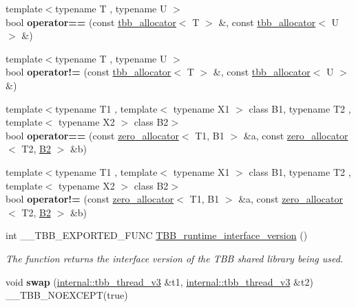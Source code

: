 \begin{DoxyCompactItemize}
\item 
\hypertarget{namespacetbb_af1595d1bfc4f7be923c17b4ee5c556ae}{}{\footnotesize template$<$typename T , typename U $>$ }\\bool {\bfseries operator==} (const \hyperlink{classtbb_1_1tbb__allocator}{tbb\+\_\+allocator}$<$ T $>$ \&, const \hyperlink{classtbb_1_1tbb__allocator}{tbb\+\_\+allocator}$<$ U $>$ \&)\label{namespacetbb_af1595d1bfc4f7be923c17b4ee5c556ae}

\item 
\hypertarget{namespacetbb_a82ff968904aaa1bb0e2152f590c47be6}{}{\footnotesize template$<$typename T , typename U $>$ }\\bool {\bfseries operator!=} (const \hyperlink{classtbb_1_1tbb__allocator}{tbb\+\_\+allocator}$<$ T $>$ \&, const \hyperlink{classtbb_1_1tbb__allocator}{tbb\+\_\+allocator}$<$ U $>$ \&)\label{namespacetbb_a82ff968904aaa1bb0e2152f590c47be6}

\item 
\hypertarget{namespacetbb_a7bf465e2f6730e2cea0c9531bec9fb2f}{}{\footnotesize template$<$typename T1 , template$<$ typename X1 $>$ class B1, typename T2 , template$<$ typename X2 $>$ class B2$>$ }\\bool {\bfseries operator==} (const \hyperlink{classtbb_1_1zero__allocator}{zero\+\_\+allocator}$<$ T1, B1 $>$ \&a, const \hyperlink{classtbb_1_1zero__allocator}{zero\+\_\+allocator}$<$ T2, \hyperlink{classB2}{B2} $>$ \&b)\label{namespacetbb_a7bf465e2f6730e2cea0c9531bec9fb2f}

\item 
\hypertarget{namespacetbb_a606762cf7c614cb5a1631955938737cd}{}{\footnotesize template$<$typename T1 , template$<$ typename X1 $>$ class B1, typename T2 , template$<$ typename X2 $>$ class B2$>$ }\\bool {\bfseries operator!=} (const \hyperlink{classtbb_1_1zero__allocator}{zero\+\_\+allocator}$<$ T1, B1 $>$ \&a, const \hyperlink{classtbb_1_1zero__allocator}{zero\+\_\+allocator}$<$ T2, \hyperlink{classB2}{B2} $>$ \&b)\label{namespacetbb_a606762cf7c614cb5a1631955938737cd}

\item 
int \+\_\+\+\_\+\+T\+B\+B\+\_\+\+E\+X\+P\+O\+R\+T\+E\+D\+\_\+\+F\+U\+N\+C \hyperlink{namespacetbb_a5f474a376c6d74ac55c943da765d609b}{T\+B\+B\+\_\+runtime\+\_\+interface\+\_\+version} ()
\begin{DoxyCompactList}\small\item\em The function returns the interface version of the T\+B\+B shared library being used. \end{DoxyCompactList}\item 
\hypertarget{namespacetbb_a467930903ce9b7c240c4ad8f0fb8ae3d}{}void {\bfseries swap} (\hyperlink{classtbb_1_1internal_1_1tbb__thread__v3}{internal\+::tbb\+\_\+thread\+\_\+v3} \&t1, \hyperlink{classtbb_1_1internal_1_1tbb__thread__v3}{internal\+::tbb\+\_\+thread\+\_\+v3} \&t2) \+\_\+\+\_\+\+T\+B\+B\+\_\+\+N\+O\+E\+X\+C\+E\+P\+T(true)\label{namespacetbb_a467930903ce9b7c240c4ad8f0fb8ae3d}


\end{DoxyCompactItemize}
